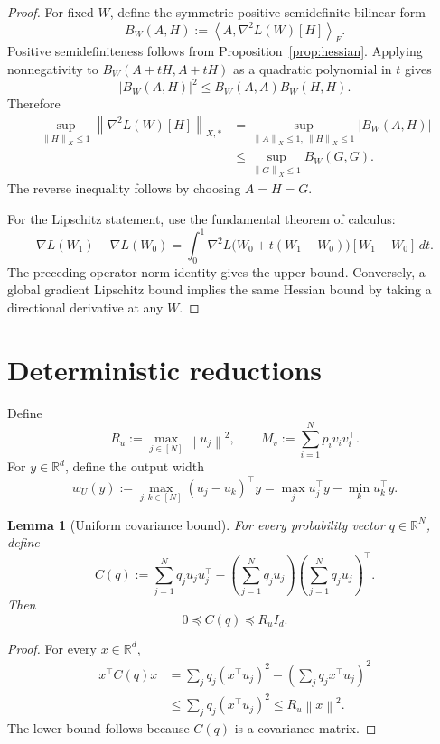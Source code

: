 \documentclass[11pt]{article}
\newtheorem{lemma}[theorem]{Lemma}
\newcommand{\R}{\mathbb{R}}
\newcommand{\1}{\mathbf{1}}
\newcommand{\ip}[2]{\left\langle #1,#2\right\rangle_F}
\newcommand{\norm}[1]{\left\|#1\right\|}
\newcommand{\abs}[1]{\left|#1\right|}
\begin{document}
\begin{proof}
For fixed \(W\), define the symmetric positive-semidefinite bilinear form
\[
 B_W(A,H):=\ip{A}{\nabla^2L(W)[H]}.
\]
Positive semidefiniteness follows from Proposition~\ref{prop:hessian}.  Applying
nonnegativity to \(B_W(A+tH,A+tH)\) as a quadratic polynomial in \(t\) gives
\[
 \abs{B_W(A,H)}^2\le B_W(A,A)B_W(H,H).
\]
Therefore
\begin{align*}
 \sup_{\norm{H}_X\le1}
 \norm{\nabla^2L(W)[H]}_{X,*}
 &=
 \sup_{\norm{A}_X\le1,\ \norm{H}_X\le1}
 \abs{B_W(A,H)}\\
 &\le
 \sup_{\norm{G}_X\le1}B_W(G,G).
\end{align*}
The reverse inequality follows by choosing \(A=H=G\).

For the Lipschitz statement, use the fundamental theorem of calculus:
\[
 \nabla L(W_1)-\nabla L(W_0)
 =
 \int_0^1
 \nabla^2L\bigl(W_0+t(W_1-W_0)\bigr)[W_1-W_0] \,dt.
\]
The preceding operator-norm identity gives the upper bound.  Conversely, a
global gradient Lipschitz bound implies the same Hessian bound by taking a
directional derivative at any \(W\).
\end{proof}

\section{Deterministic reductions}
\label{sec:deterministic}

Define
\[
 R_u:=\max_{j\in[N]}\norm{u_j}^2,
 \qquad
 M_v:=\sum_{i=1}^N p_i v_iv_i^\top.
\]
For \(y\in\R^d\), define the output width
\[
 w_U(y)
 :=
 \max_{j,k\in[N]}(u_j-u_k)^\top y
 =
 \max_j u_j^\top y-\min_k u_k^\top y.
\]

\begin{lemma}[Uniform covariance bound]
\label{lem:covariance-upper}
For every probability vector \(q\in\R^N\), define
\[
 C(q)
 :=
 \sum_{j=1}^N q_j u_ju_j^\top
 -\left(\sum_{j=1}^N q_j u_j\right)
  \left(\sum_{j=1}^N q_j u_j\right)^\top.
\]
Then
\[
 0\preceq C(q)\preceq R_u I_d.
\]
\end{lemma}

\begin{proof}
For every \(x\in\R^d\),
\begin{align*}
 x^\top C(q)x
 &=
 \sum_j q_j(x^\top u_j)^2
 -\left(\sum_j q_jx^\top u_j\right)^2\\
 &\le
 \sum_j q_j(x^\top u_j)^2
 \le
 R_u\norm{x}^2.
\end{align*}
The lower bound follows because \(C(q)\) is a covariance matrix.
\end{proof}
\end{document}
